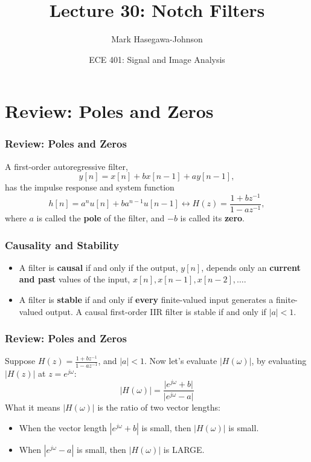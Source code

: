 \documentclass{beamer}
\title{Lecture 30: Notch Filters}
\author{Mark Hasegawa-Johnson}
\date{ECE 401: Signal and Image Analysis}
\begin{document}
\begin{frame}
  \maketitle
\end{frame}

\begin{frame}
  \tableofcontents
\end{frame}

\section[Review]{Review: Poles and Zeros}
\setcounter{subsection}{1}

\begin{frame}
  \frametitle{Review: Poles and Zeros}
  A first-order autoregressive filter,
  \[
  y[n] = x[n]+bx[n-1]+ay[n-1],
  \]
  has the impulse response and system function
  \[
  h[n]=a^n u[n]+ba^{n-1}u[n-1] \leftrightarrow H(z)  = \frac{1+bz^{-1}}{1-az^{-1}},
  \]
  where $a$ is called the {\bf pole} of the filter, and $-b$ is called
  its {\bf zero}.
\end{frame}

\begin{frame}
  \frametitle{Causality and Stability}
  \begin{itemize}
  \item A filter is {\bf causal} if and only if the output, $y[n]$,
    depends only an {\bf current and past} values of the input, $x[n],
    x[n-1],x[n-2],\ldots$.
  \item A filter is {\bf stable} if and only if {\bf every}
    finite-valued input generates a finite-valued output.  A causal
    first-order IIR filter is stable if and only if $|a|<1$.
  \end{itemize}
\end{frame}

\begin{frame}
  \frametitle{Review: Poles and Zeros}

  Suppose $H(z)=\frac{1+bz^{-1}}{1-az^{-1}}$, and $|a|<1$.  Now let's
  evaluate $|H(\omega)|$, by evaluating $|H(z)|$ at $z=e^{j\omega}$:
  \[
  \vert H(\omega)\vert = 
  \frac{\vert e^{j\omega}+b\vert}{\vert e^{j\omega}-a\vert}
  \]
  What it means $|H(\omega)|$ is the ratio of two vector lengths:
  \begin{itemize}
  \item When the vector length $|e^{j\omega}+b|$ is small, then
    $|H(\omega)|$ is small.
  \item When $|e^{j\omega}-a|$ is small, then $|H(\omega)|$ is LARGE.
  \end{itemize}
\end{frame}
\end{document}
